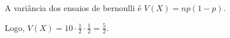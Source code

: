 \newpage
\item
A variância dos ensaios de bernoulli é $V(X) = np(1-p)$.

Logo, $V(X) = 10 \cdot \frac{1}{2} \cdot \frac{1}{2} = \frac{5}{2}$.


